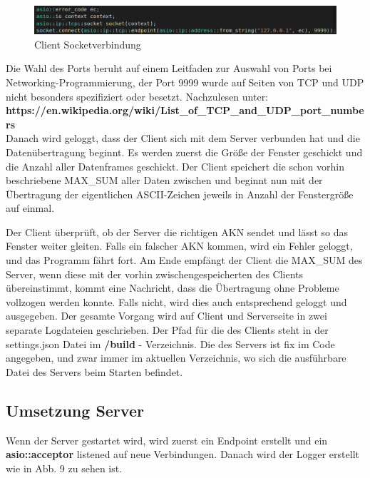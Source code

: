 \documentclass{article}
\begin{document}
\begin{center}
\begin{figure}[h]
    \centering
    \includegraphics[width=\textwidth]{clientep.png}
    \caption{Client Socketverbindung}
\end{figure}
\end{center}

Die Wahl des Ports beruht auf einem Leitfaden zur Auswahl von Ports bei Networking-Programmierung, der Port 9999 wurde auf Seiten von TCP und UDP nicht besonders spezifiziert oder besetzt. Nachzulesen unter:\\ \textbf{https://en.wikipedia.org/wiki/List\_of\_TCP\_and\_UDP\_port\_numbers}
\\
\newline
Danach wird geloggt, dass der Client sich mit dem Server verbunden hat und die Datenübertragung beginnt. Es werden zuerst die Größe der Fenster geschickt und die Anzahl aller Datenframes geschickt. Der Client speichert die schon vorhin beschriebene MAX\_SUM aller Daten zwischen und beginnt nun mit der Übertragung der eigentlichen ASCII-Zeichen jeweils in Anzahl der Fenstergröße auf einmal.

Der Client überprüft, ob der Server die richtigen AKN sendet und lässt so das Fenster weiter gleiten. Falls ein falscher AKN kommen, wird ein Fehler geloggt, und das Programm fährt fort. Am Ende empfängt der Client die MAX\_SUM des Server, wenn diese mit der vorhin zwischengespeicherten des Clients übereinstimmt, kommt eine Nachricht, dass die Übertragung ohne Probleme vollzogen werden konnte. Falls nicht, wird dies auch entsprechend geloggt und ausgegeben. Der gesamte Vorgang wird auf Client und Serverseite in zwei separate Logdateien geschrieben. Der Pfad für die des Clients steht in der settings.json Datei im \textbf{/build} - Verzeichnis. Die des Servers ist fix im Code angegeben, und zwar immer im aktuellen Verzeichnis, wo sich die ausführbare Datei des Servers beim Starten befindet.

\subsection{Umsetzung Server}

Wenn der Server gestartet wird, wird zuerst ein Endpoint erstellt und ein \textbf{asio::acceptor} listened auf neue Verbindungen. Danach wird der Logger erstellt wie in Abb. 9 zu sehen ist.
\end{document}
